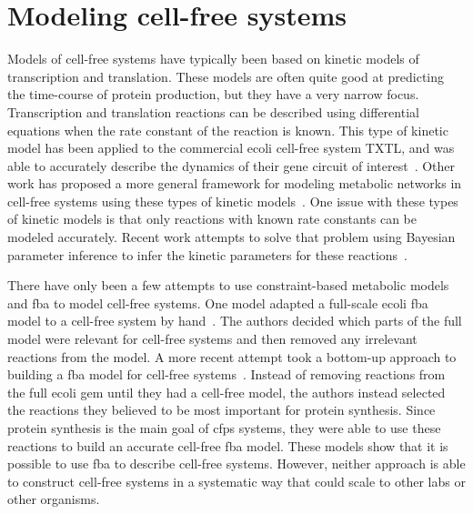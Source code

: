 \section{Modeling cell-free systems}\label{rw:mod-cf}
Models of cell-free systems have typically been based on kinetic models of transcription and translation.
These models are often quite good at predicting the time-course of protein production, but they have a very narrow focus.
Transcription and translation reactions can be described using differential equations when the rate constant of the reaction is known.
This type of kinetic model has been applied to the commercial \gls{ecoli} cell-free system TXTL, and was able to accurately describe the dynamics of their gene circuit of interest~\cite{tuza2013silico}.
Other work has proposed a more general framework for modeling metabolic networks in cell-free systems using these types of kinetic models~\cite{wayman2015dynamic}.
One issue with these types of kinetic models is that only reactions with known rate constants can be modeled accurately.
Recent work attempts to solve that problem using Bayesian parameter inference to infer the kinetic parameters for these reactions~\cite{moore2018rapid}.

There have only been a few attempts to use constraint-based metabolic models and \gls{fba} to model cell-free systems.
One model adapted a full-scale \gls{ecoli} \gls{fba} model to a cell-free system by hand~\cite{bujara2012silico}.
The authors decided which parts of the full model were relevant for cell-free systems and then removed any irrelevant reactions from the model.
A more recent attempt took a bottom-up approach to building a \gls{fba} model for cell-free systems~\cite{vilkhovoy2017sequence}.
Instead of removing reactions from the full \gls{ecoli} \gls{gem} until they had a cell-free model, the authors instead selected the reactions they believed to be most important for protein synthesis.
Since protein synthesis is the main goal of \gls{cfps} systems, they were able to use these reactions to build an accurate cell-free \gls{fba} model.
These models show that it is possible to use \gls{fba} to describe cell-free systems.
However, neither approach is able to construct cell-free systems in a systematic way that could scale to other labs or other organisms.


